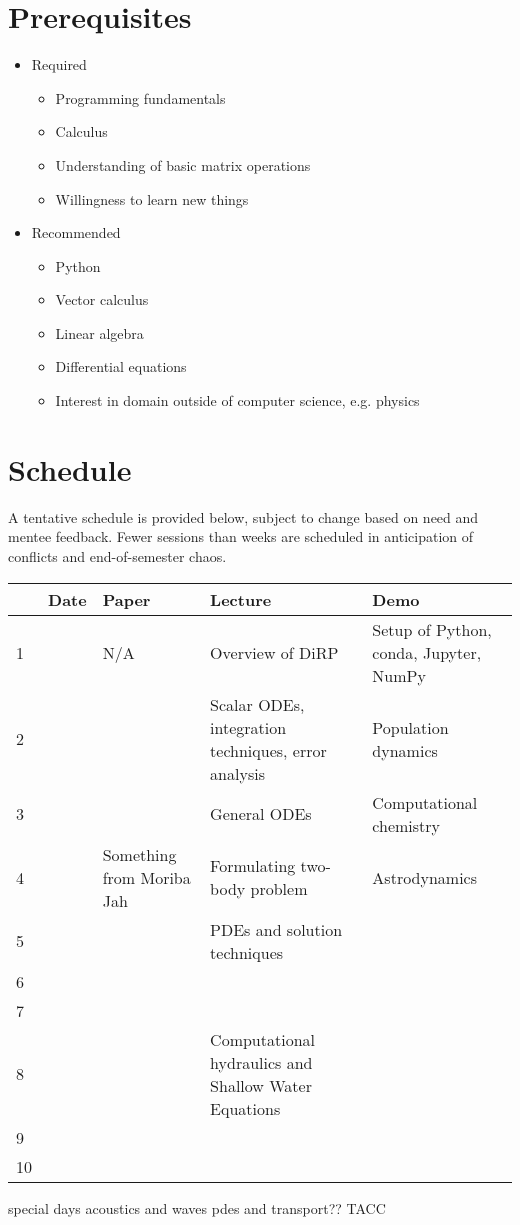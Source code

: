 \documentclass{article}
\begin{document}
	\section*{Prerequisites}
	\begin{itemize}
		\item Required
		\begin{itemize}
			\item Programming fundamentals
			\item Calculus
			\item Understanding of basic matrix operations
			\item Willingness to learn new things
		\end{itemize}
		\item Recommended
		\begin{itemize}
			\item Python
			\item Vector calculus
			\item Linear algebra
			\item Differential equations
			\item Interest in domain outside of computer science, e.g. physics
		\end{itemize}
	\end{itemize}

	\section*{Schedule}
	A tentative schedule is provided below, subject to change based on need and mentee feedback. Fewer sessions than weeks are scheduled in anticipation of conflicts and end-of-semester chaos.
	
	\begin{tabular}{l|lp{3cm}p{4cm}p{4cm}}
		& Date & Paper & Lecture & Demo \\
		\hline
		1 &  & N/A & Overview of DiRP & Setup of Python, conda, Jupyter, NumPy \\
		\hline
		2 &  &  & Scalar ODEs, integration techniques, error analysis & Population dynamics \\
		\hline
		3 &  &  & General ODEs & Computational chemistry \\
		\hline
		4 &  & Something from Moriba Jah & Formulating two-body problem & Astrodynamics \\
		\hline
		5 &  &  & PDEs and solution techniques &  \\
		\hline
		6 &  &  &  &  \\
		\hline
		7 &  &  &  &  \\
		\hline
		8 &  &  & Computational hydraulics and Shallow Water Equations &  \\
		\hline
		9 &  &  &  &  \\
		\hline
		10 &  &  &  &  \\
	\end{tabular}
	
	special days
	acoustics and waves
	pdes and transport??
	TACC
\end{document}
